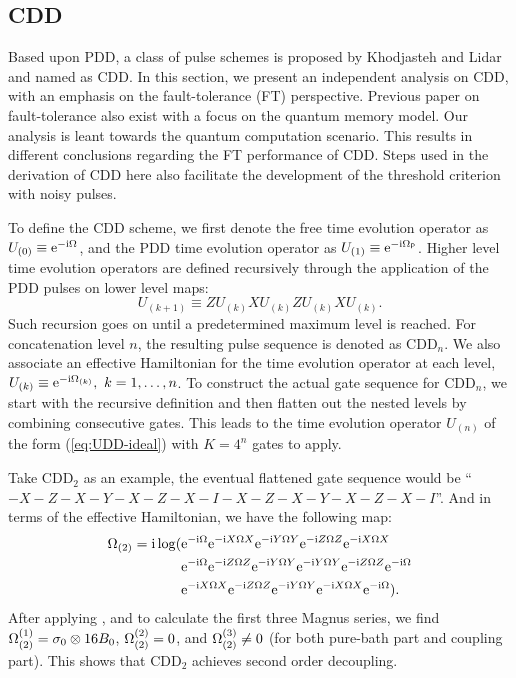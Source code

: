 \documentclass[aps,pra,reprint,superscriptaddress]{revtex4-2}
\newcommand{\Opdd}{\Omega_{\mathsf{P}}}
\begin{document}
\subsection{CDD}
Based upon PDD, a class of pulse schemes is proposed by Khodjasteh and Lidar \cite{khodjasteh2005fault} and named as CDD.
In this section, we present an independent analysis on CDD, with an emphasis  on the fault-tolerance (FT) perspective.
Previous paper on fault-tolerance also exist \cite{khodjasteh2007performance} with a focus on the quantum memory model. Our analysis is leant towards the quantum computation scenario. This results in different conclusions regarding the FT performance of CDD. Steps used in the derivation of CDD here also facilitate the development of the threshold criterion with noisy pulses.

To define the CDD scheme, we first denote the free time evolution operator as 
$U_{(0)}\equiv \mathrm{e}^{-\mathrm{i} \Omega}$, 
and the PDD time evolution operator as
$U_{(1)} \equiv \upe^{-\upi \Opdd}$. 
Higher level time evolution operators are defined recursively through the application of the PDD pulses on lower level maps:
\begin{equation}\label{eq:CDD-definition}
    U_{(k+1)} \equiv Z U_{(k)} X U_{(k)} Z U_{(k)} X U_{(k)}.
\end{equation}
Such recursion goes on until a predetermined maximum level is reached. For  concatenation level $n$, the resulting pulse sequence is denoted as  $\mathrm{CDD}_n$. We also associate an effective Hamiltonian for the time evolution operator at each level, 
$U_{(k)} \equiv \mathrm{e}^{-\mathrm{i} \Omega_{(k)}},\ k=1,\ldots, n$.
To construct the actual gate sequence for $\mathrm{CDD}_n$, we start with the recursive definition and then flatten out the nested levels by combining consecutive gates. This leads to the time evolution operator $U_{(n)}$ of the form (\ref{eq:UDD-ideal}) with $K=4^n$ gates to apply. 

Take $\mathrm{CDD}_2$ as an example, the eventual flattened gate sequence would be
``$-X-Z-X-Y-X-Z-X-I-X-Z-X-Y-X-Z-X-I$''. And in terms of the effective Hamiltonian, we have the following map:
\begin{equation*}
\begin{aligned}
\Omega_{(2)}=\mathrm{i} \log(
&\mathrm{e}^{-\mathrm{i} \Omega }\mathrm{e}^{-\mathrm{i} X\Omega X}\mathrm{e}^{-\mathrm{i} Y\Omega Y}\mathrm{e}^{-\mathrm{i} Z\Omega Z}
\mathrm{e}^{-\mathrm{i} X\Omega X}\\
&\mathrm{e}^{-\mathrm{i} \Omega }\mathrm{e}^{-\mathrm{i} Z\Omega Z}\mathrm{e}^{-\mathrm{i} Y\Omega Y}
\mathrm{e}^{-\mathrm{i} Y\Omega Y}\mathrm{e}^{-\mathrm{i} Z\Omega Z}\mathrm{e}^{-\mathrm{i} \Omega }\\
&\mathrm{e}^{-\mathrm{i} X\Omega X}
\mathrm{e}^{-\mathrm{i} Z\Omega Z}\mathrm{e}^{-\mathrm{i} Y\Omega Y}\mathrm{e}^{-\mathrm{i} X\Omega X}\mathrm{e}^{-\mathrm{i} \Omega }).
\end{aligned}  
\end{equation*}
After applying , and  to calculate the first three Magnus series, we find $\Omega_{(2)}^{(1)} = \sigma_0 \otimes 16 B_0$, $\Omega_{(2)}^{(2)} =0$, and $\Omega_{(2)}^{(3)} \neq 0$ (for both  pure-bath part and coupling part). This shows that $\mathrm{CDD}_2$  achieves second order decoupling. 
\end{document}
